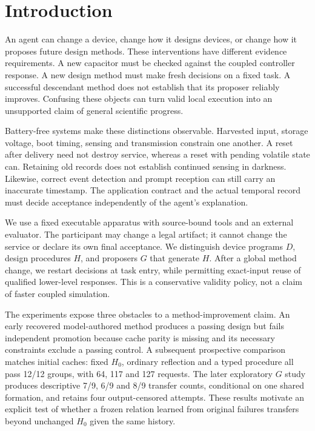 \section{Introduction}
An agent can change a device, change how it designs devices, or change how it
proposes future design methods. These interventions have different evidence
requirements. A new capacitor must be checked against the coupled controller
response. A new design method must make fresh decisions on a fixed task. A
successful descendant method does not establish that its proposer reliably
improves. Confusing these objects can turn valid local execution into an
unsupported claim of general scientific progress.

Battery-free systems make these distinctions observable. Harvested input,
storage voltage, boot timing, sensing and transmission constrain one another.
A reset after delivery need not destroy service, whereas a reset with pending
volatile state can. Retaining old records does not establish continued sensing
in darkness. Likewise, correct event detection and prompt reception can still
carry an inaccurate timestamp. The application contract and the actual temporal
record must decide acceptance independently of the agent's explanation.

We use a fixed executable apparatus with source-bound tools and an external
evaluator. The participant may change a legal artifact; it cannot change the
service or declare its own final acceptance. We distinguish device programs
$D$, design procedures $H$, and proposers $G$ that generate $H$. After a global
method change, we restart decisions at task entry, while permitting exact-input
reuse of qualified lower-level responses. This is a conservative validity
policy, not a claim of faster coupled simulation.

The experiments expose three obstacles to a method-improvement claim. An early
recovered model-authored method produces a passing design but fails independent
promotion because cache parity is missing and its necessary constraints exclude
a passing control. A subsequent prospective comparison matches initial caches:
fixed $H_0$, ordinary reflection and a typed procedure all pass 12/12 groups,
with 64, 117 and 127 requests. The later exploratory $G$ study produces descriptive
7/9, 6/9 and 8/9 transfer counts, conditional on one shared formation, and retains
four output-censored attempts. These results motivate an explicit test of
whether a frozen relation learned from original failures transfers beyond
unchanged $H_0$ given the same history.

